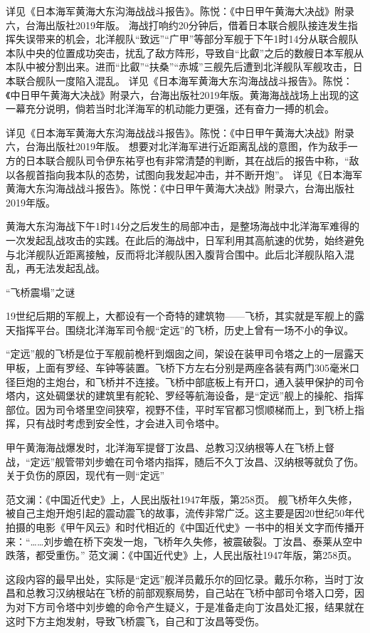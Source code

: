 \documentclass[12pt,UTF8]{ctexbook}
\begin{document}
详见《日本海军黄海大东沟海战战斗报告》。陈悦：《中日甲午黄海大决战》附录六，台海出版社2019年版。
海战打响约20分钟后，借着日本联合舰队接连发生指挥失误带来的机会，北洋舰队“致远”“广甲”等部分军舰于下午1时14分从联合舰队本队中央的位置成功突击，扰乱了敌方阵形，导致自“比叡”之后的数艘日本军舰从本队中被分割出来。进而“比叡”“扶桑”“赤城”三舰先后遭到北洋舰队军舰攻击，日本联合舰队一度陷入混乱。 详见《日本海军黄海大东沟海战战斗报告》。陈悦：《中日甲午黄海大决战》附录六，台海出版社2019年版。黄海海战战场上出现的这一幕充分说明，倘若当时北洋海军的机动能力更强，还有奋力一搏的机会。

详见《日本海军黄海大东沟海战战斗报告》。陈悦：《中日甲午黄海大决战》附录六，台海出版社2019年版。
想要对北洋海军进行近距离乱战的意图，作为敌手一方的日本联合舰队司令伊东祐亨也有非常清楚的判断，其在战后的报告中称，“敌以各舰首指向我本队的态势，试图向我发起冲击，并不断开炮”。 详见《日本海军黄海大东沟海战战斗报告》。陈悦：《中日甲午黄海大决战》附录六，台海出版社2019年版。

黄海大东沟海战下午1时14分之后发生的局部冲击，是整场海战中北洋海军难得的一次发起乱战攻击的实践。在此后的海战中，日军利用其高航速的优势，始终避免与北洋舰队近距离接触，反而将北洋舰队困入腹背合围中。此后北洋舰队陷入混乱，再无法发起乱战。

“飞桥震塌”之谜

19世纪后期的军舰上，大都设有一个奇特的建筑物——飞桥，其实就是军舰上的露天指挥平台。围绕北洋海军司令舰“定远”的飞桥，历史上曾有一场不小的争议。

“定远”舰的飞桥是位于军舰前桅杆到烟囱之间，架设在装甲司令塔之上的一层露天甲板，上面有罗经、车钟等装置。飞桥下方左右分别是两座各装有两门305毫米口径巨炮的主炮台，和飞桥并不连接。飞桥中部底板上有开口，通入装甲保护的司令塔内，这处碉堡状的建筑里有舵轮、罗经等航海设备，是“定远”舰上的操舵、指挥部位。因为司令塔里空间狭窄，视野不佳，平时军官都习惯顺梯而上，到飞桥上指挥，只有战时考虑到安全性，才会进入司令塔中。

甲午黄海海战爆发时，北洋海军提督丁汝昌、总教习汉纳根等人在飞桥上督战，“定远”舰管带刘步蟾在司令塔内指挥，随后不久丁汝昌、汉纳根等就负了伤。关于负伤的原因，现代有一则“定远”

范文澜：《中国近代史》上，人民出版社1947年版，第258页。
舰飞桥年久失修，被自己主炮开炮引起的震动震飞的故事，流传非常广泛。这主要是因20世纪50年代拍摄的电影《甲午风云》和时代相近的《中国近代史》一书中的相关文字而传播开来：“……刘步蟾在桥下突发一炮，飞桥年久失修，被震破裂。丁汝昌、泰莱从空中跌落，都受重伤。” 范文澜：《中国近代史》上，人民出版社1947年版，第258页。

这段内容的最早出处，实际是“定远”舰洋员戴乐尔的回忆录。戴乐尔称，当时丁汝昌和总教习汉纳根站在飞桥的前部观察局势，自己站在飞桥中部司令塔入口旁，因为对下方司令塔中刘步蟾的命令产生疑义，于是准备走向丁汝昌处汇报，结果就在这时下方主炮发射，导致飞桥震飞，自己和丁汝昌等受伤。
\end{document}
